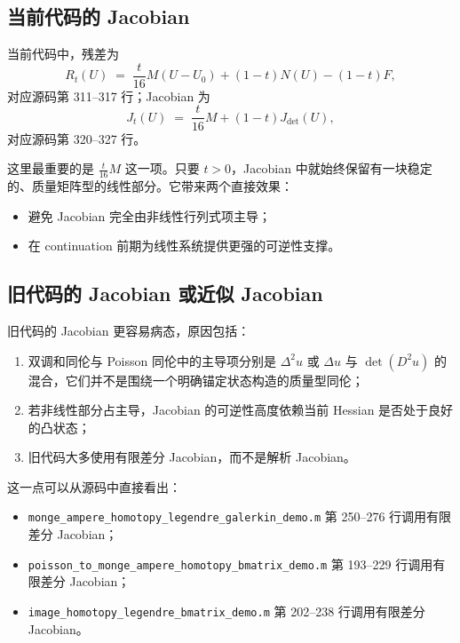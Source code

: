 \documentclass[11pt,a4paper]{article}
\begin{document}
\subsection{当前代码的 Jacobian}
当前代码中，残差为
\begin{equation}
R_t(U)
\;=\;
\frac{t}{16}M(U-U_0) + (1-t)N(U) - (1-t)F,
\label{eq:new_residual}
\end{equation}
对应源码第 311--317 行；Jacobian 为
\begin{equation}
J_t(U)
\;=\;
\frac{t}{16}M + (1-t)J_{\det}(U),
\label{eq:new_jacobian}
\end{equation}
对应源码第 320--327 行。

这里最重要的是 $\frac{t}{16}M$ 这一项。只要 $t>0$，Jacobian 中就始终保留有一块稳定的、质量矩阵型的线性部分。它带来两个直接效果：
\begin{itemize}[leftmargin=2em]
\item 避免 Jacobian 完全由非线性行列式项主导；
\item 在 continuation 前期为线性系统提供更强的可逆性支撑。
\end{itemize}

\subsection{旧代码的 Jacobian 或近似 Jacobian}
旧代码的 Jacobian 更容易病态，原因包括：
\begin{enumerate}[leftmargin=2em]
\item 双调和同伦与 Poisson 同伦中的主导项分别是 $\Delta^2u$ 或 $\Delta u$ 与 $\det(D^2u)$ 的混合，它们并不是围绕一个明确锚定状态构造的质量型同伦；
\item 若非线性部分占主导，Jacobian 的可逆性高度依赖当前 Hessian 是否处于良好的凸状态；
\item 旧代码大多使用有限差分 Jacobian，而不是解析 Jacobian。
\end{enumerate}

这一点可以从源码中直接看出：
\begin{itemize}[leftmargin=2em]
\item \texttt{monge\_ampere\_homotopy\_legendre\_galerkin\_demo.m} 第 250--276 行调用有限差分 Jacobian；
\item \texttt{poisson\_to\_monge\_ampere\_homotopy\_bmatrix\_demo.m} 第 193--229 行调用有限差分 Jacobian；
\item \texttt{image\_homotopy\_legendre\_bmatrix\_demo.m} 第 202--238 行调用有限差分 Jacobian。
\end{itemize}
\end{document}
